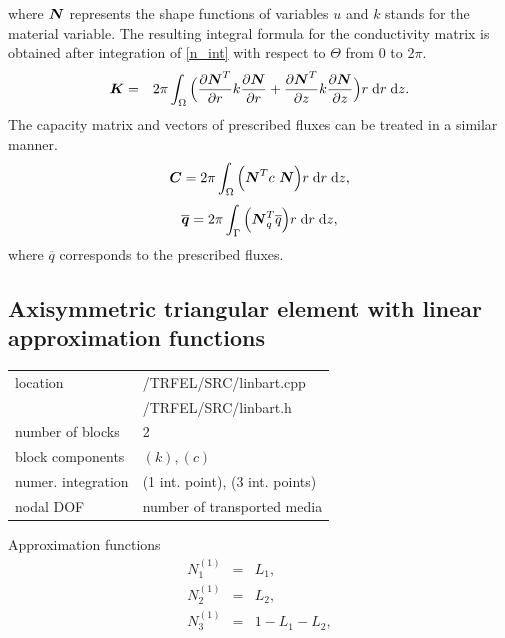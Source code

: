 where $\mbox{\boldmath$N$}$ represents the shape functions of variables $u$ and $k$ stands for the 
material variable. 
The resulting integral formula for the conductivity matrix is obtained after integration 
of \eqref{n_int} with respect to $\Theta$ from 0 to 2$\pi$.
\begin{eqnarray}\label{int_k}
\mbox{\boldmath$K$} &=& 2\pi \int_{\Omega} \Big(\frac{\partial \mbox{\boldmath$N$}^T}{\partial r}k\frac{\partial \mbox{\boldmath$N$}}{\partial r} + 
\frac{\partial \mbox{\boldmath$N$}^T}{\partial z}k\frac{\partial \mbox{\boldmath$N$}}{\partial z}\Big)
r \;{\rm d}r \;{\rm d}z.
\end{eqnarray}
The capacity matrix and vectors of prescribed fluxes can be treated in a similar manner.
\begin{eqnarray}
\mbox{\boldmath$C$} = 2\pi \int_{\Omega} \Big( \mbox{\boldmath$N$}^T c\ \mbox{\boldmath$N$}\Big) r \;{\rm d}r \;{\rm d}z ,
\end{eqnarray}
\begin{eqnarray}
\overline{\mbox{\boldmath$q$}} = 2\pi \int_{\Gamma} \Big(\mbox{\boldmath$N$}_q^T  \overline{q}\Big) r \;{\rm d}r \;{\rm d}z,
\end{eqnarray}
where $\overline{q}$ corresponds to the prescribed fluxes.

\subsection{Axisymmetric triangular element with linear approximation functions}
\label{trlaxt}

\begin{center}
\begin{tabular}{|l|l|}
\hline
location & /TRFEL/SRC/linbart.cpp\\
         & /TRFEL/SRC/linbart.h
\\ \hline
number of blocks & 2
\\ \hline
block components & $(k), (c)$
\\ \hline
numer. integration & (1 int. point), (3 int. points)
\\ \hline
nodal DOF & number of transported media
\\ \hline
\end{tabular}
\end{center}

Approximation functions
\begin{eqnarray}
N_1^{(1)} &=& L_1,\nonumber\\
N_2^{(1)} &=& L_2,\nonumber\\
N_3^{(1)} &=& 1-L_1-L_2,
\end{eqnarray}

